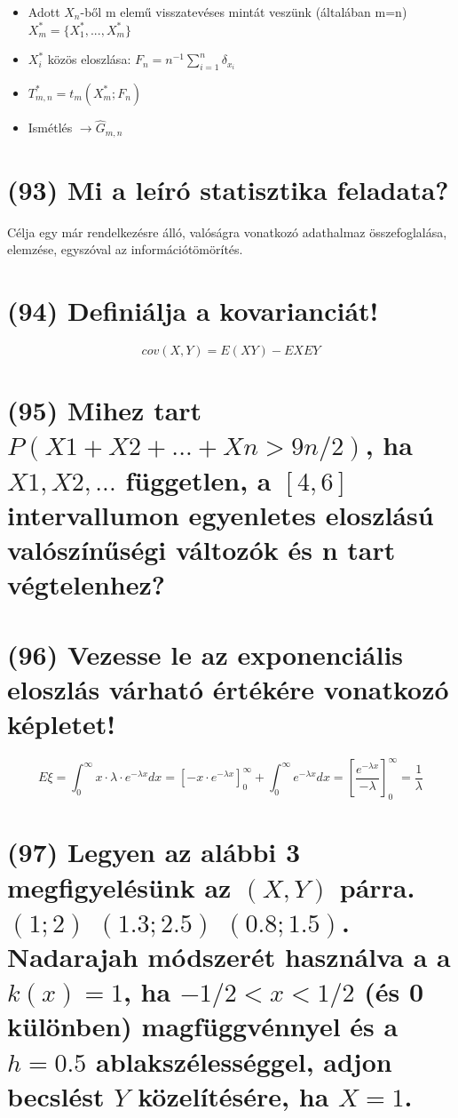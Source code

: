 \documentclass[12p]{article}
\begin{document}
\begin{itemize}
	\item Adott $X_n$-ből m elemű visszatevéses mintát veszünk (általában m=n) \quad $X^{*}_m = \{X^{*}_1,...,X^{*}_m\}$
	\item $X_i^{*}$ közös eloszlása: $F_n = n^{-1} \sum^n_{i=1} \delta_{x_i}$
	\item $T^{*}_{m,n} = t_m (X^{*}_m;F_n)$
	\item Ismétlés $\rightarrow \hat{G}_{m,n}$
	
\end{itemize}


\section{(93) Mi a leíró statisztika feladata?}

Célja egy már rendelkezésre álló, valóságra vonatkozó adathalmaz összefoglalása, elemzése, egyszóval az információtömörítés.\\

\section{(94) Definiálja a kovarianciát!}

$$cov(X, Y) = E(XY) - EXEY$$

\section{(95) Mihez tart $P(X1+X2+ ... +Xn > 9n/2)$, ha $X1, X2, . . .$ független, a $[4,6]$ intervallumon
egyenletes eloszlású valószínűségi változók és n tart végtelenhez?}

\section{(96) Vezesse le az exponenciális eloszlás várható értékére vonatkozó képletet!}

$$E \xi = \int^{\infty}_0 x \cdot \lambda \cdot e^{-\lambda x} dx = [-x \cdot e^{-\lambda x}]^{\infty}_0 + \int^{\infty}_0 e^{-\lambda x} dx = \left[\frac{e^{-\lambda x}}{-\lambda} \right]^{\infty}_0 = \frac{1}{\lambda}$$

\section{(97) Legyen az alábbi 3 megfigyelésünk az $(X, Y)$ párra. $(1;2)$ $(1.3;2.5)$ $(0.8;1.5)$. Nadarajah
módszerét használva a a $k(x) = 1$, ha $-1/2 < x < 1/2$ (és 0 különben) magfüggvénnyel és a $h = 0.5$ ablakszélességgel, adjon becslést $Y$ közelítésére, ha $X = 1$.}
\end{document}
